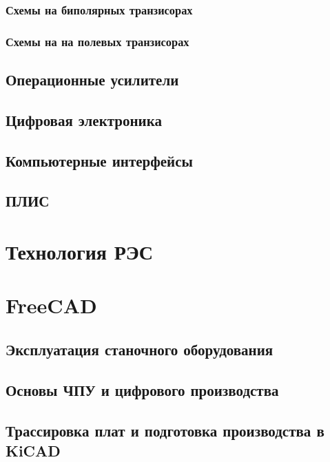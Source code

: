\section{Схемы на биполярных транзисорах} 

\section{Схемы на на полевых транзисорах}

\chapter{Операционные усилители}

\chapter{Цифровая электроника}

\chapter{Компьютерные интерфейсы}

\chapter{ПЛИС}

\part{Технология РЭС}

\part{FreeCAD}

\chapter{Эксплуатация станочного оборудования}

\chapter{Основы ЧПУ и цифрового производства}

\chapter{Трассировка плат и подготовка производства в KiCAD}

